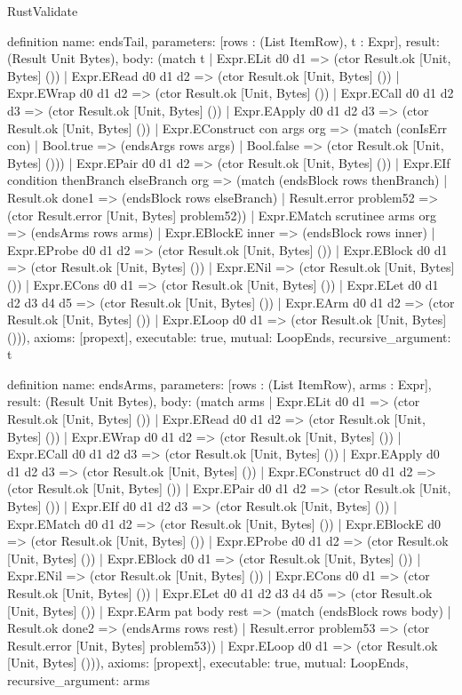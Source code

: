 \begin{lexlean}{RustValidate}
\begin{semanticmodule}
definition{
  name: endsTail,
  parameters: [rows : (List ItemRow), t : Expr],
  result: (Result Unit Bytes),
  body: (match t
    | Expr.ELit d0 d1 => (ctor Result.ok [Unit, Bytes] ())
    | Expr.ERead d0 d1 d2 => (ctor Result.ok [Unit, Bytes] ())
    | Expr.EWrap d0 d1 d2 => (ctor Result.ok [Unit, Bytes] ())
    | Expr.ECall d0 d1 d2 d3 => (ctor Result.ok [Unit, Bytes] ())
    | Expr.EApply d0 d1 d2 d3 => (ctor Result.ok [Unit, Bytes] ())
    | Expr.EConstruct con args org => (match (conIsErr con)
      | Bool.true => (endsArgs rows args)
      | Bool.false => (ctor Result.ok [Unit, Bytes] ()))
    | Expr.EPair d0 d1 d2 => (ctor Result.ok [Unit, Bytes] ())
    | Expr.EIf condition thenBranch elseBranch org => (match (endsBlock rows thenBranch)
      | Result.ok done1 => (endsBlock rows elseBranch)
      | Result.error problem52 => (ctor Result.error [Unit, Bytes] problem52))
    | Expr.EMatch scrutinee arms org => (endsArms rows arms)
    | Expr.EBlockE inner => (endsBlock rows inner)
    | Expr.EProbe d0 d1 d2 => (ctor Result.ok [Unit, Bytes] ())
    | Expr.EBlock d0 d1 => (ctor Result.ok [Unit, Bytes] ())
    | Expr.ENil => (ctor Result.ok [Unit, Bytes] ())
    | Expr.ECons d0 d1 => (ctor Result.ok [Unit, Bytes] ())
    | Expr.ELet d0 d1 d2 d3 d4 d5 => (ctor Result.ok [Unit, Bytes] ())
    | Expr.EArm d0 d1 d2 => (ctor Result.ok [Unit, Bytes] ())
    | Expr.ELoop d0 d1 => (ctor Result.ok [Unit, Bytes] ())),
  axioms: [propext],
  executable: true,
  mutual: LoopEnds,
  recursive_argument: t
}

definition{
  name: endsArms,
  parameters: [rows : (List ItemRow), arms : Expr],
  result: (Result Unit Bytes),
  body: (match arms
    | Expr.ELit d0 d1 => (ctor Result.ok [Unit, Bytes] ())
    | Expr.ERead d0 d1 d2 => (ctor Result.ok [Unit, Bytes] ())
    | Expr.EWrap d0 d1 d2 => (ctor Result.ok [Unit, Bytes] ())
    | Expr.ECall d0 d1 d2 d3 => (ctor Result.ok [Unit, Bytes] ())
    | Expr.EApply d0 d1 d2 d3 => (ctor Result.ok [Unit, Bytes] ())
    | Expr.EConstruct d0 d1 d2 => (ctor Result.ok [Unit, Bytes] ())
    | Expr.EPair d0 d1 d2 => (ctor Result.ok [Unit, Bytes] ())
    | Expr.EIf d0 d1 d2 d3 => (ctor Result.ok [Unit, Bytes] ())
    | Expr.EMatch d0 d1 d2 => (ctor Result.ok [Unit, Bytes] ())
    | Expr.EBlockE d0 => (ctor Result.ok [Unit, Bytes] ())
    | Expr.EProbe d0 d1 d2 => (ctor Result.ok [Unit, Bytes] ())
    | Expr.EBlock d0 d1 => (ctor Result.ok [Unit, Bytes] ())
    | Expr.ENil => (ctor Result.ok [Unit, Bytes] ())
    | Expr.ECons d0 d1 => (ctor Result.ok [Unit, Bytes] ())
    | Expr.ELet d0 d1 d2 d3 d4 d5 => (ctor Result.ok [Unit, Bytes] ())
    | Expr.EArm pat body rest => (match (endsBlock rows body)
      | Result.ok done2 => (endsArms rows rest)
      | Result.error problem53 => (ctor Result.error [Unit, Bytes] problem53))
    | Expr.ELoop d0 d1 => (ctor Result.ok [Unit, Bytes] ())),
  axioms: [propext],
  executable: true,
  mutual: LoopEnds,
  recursive_argument: arms
}


\end{semanticmodule}
\end{lexlean}
